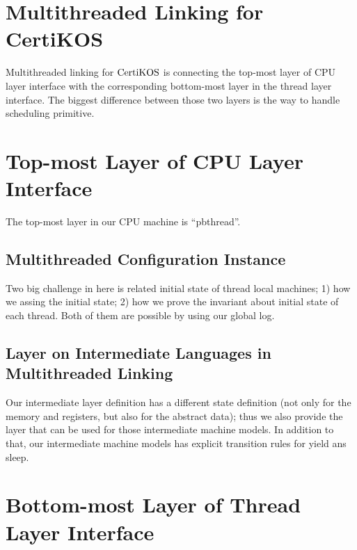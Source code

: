 \section{Multithreaded Linking for CertiKOS}
\label{chapter:certikos:sec:multithreaded-linking-for-certikos}

Multithreaded linking for $\mathrm{CertiKOS}$ is connecting the top-most layer of CPU layer
 interface with
the corresponding bottom-most layer in the thread layer interface. 
The biggest difference between those two layers is 
the way to handle scheduling primitive. 



\section{Top-most Layer of CPU Layer Interface}
\label{chapter:certikos:subsec:pbthread}

The top-most layer in our CPU machine is ``pbthread''.

\subsection{Multithreaded Configuration Instance}
\label{chapter:certikos:subsec:multithreaded-configuration-instance}

Two big challenge in here is related initial state of thread local machines; 
1) how we assing the initial state; 2) how we prove the invariant about initial state 
of each thread. 
Both of them are possible by using our global log. 


\subsection{Layer on Intermediate Languages in Multithreaded Linking}
\label{chapter:certikos:subsec:layer-on-intermediate-languages-in-multithreaded-linking}

Our intermediate layer definition has a different state definition (not only for the memory and registers, but also for the abstract data); thus we also provide the 
layer that can be used for those intermediate machine models. 
In addition to that, our intermediate machine models has explicit 
transition rules for yield ans sleep. 

\section{Bottom-most Layer of Thread Layer Interface}
\label{chapter:certikos:subsec:phthread}

